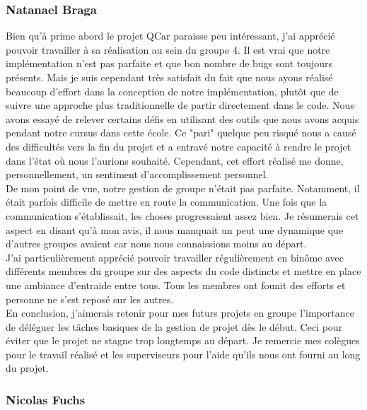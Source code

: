\documentclass[a4paper, 12pt]{article}
\begin{document}
\subsubsection{Natanael Braga}
Bien qu'à prime abord le projet QCar paraisse peu intéressant, j'ai apprécié pouvoir travailler à sa réalisation au sein du groupe 4. Il est vrai que notre implémentation n'est pas parfaite et que bon nombre de bugs sont toujours présents. Mais je suis cependant très satisfait du fait que nous ayons réalisé beaucoup d'effort dans la conception de notre implémentation, plutôt que de suivre une approche plus traditionnelle de partir directement dans le code. Nous avons essayé de relever certains défis en utilisant des outils que nous avons acquis pendant notre cursus dans cette école. Ce "pari" quelque peu risqué nous a causé des difficultés vers la fin du projet et a entravé notre capacité à rendre le projet dans l'état où nous l'aurions souhaité. Cependant, cet effort réalisé me donne, personnellement, un sentiment d'accomplissement personnel.\\
De mon point de vue, notre gestion de groupe n'était pas parfaite. Notamment, il était parfois difficile de mettre en route la communication. Une fois que la communication s'établissait, les choses progressaient assez bien. Je résumerais cet aspect en disant qu'à mon avis, il nous manquait un peut une dynamique que d'autres groupes avaient car nous nous connaissions moins au départ.\\
J'ai particulièrement apprécié pouvoir travailler régulièrement en binôme avec différents membres du groupe sur des aspects du code distincts et mettre en place une ambiance d'entraide entre tous. Tous les membres ont founit des efforts et personne ne s'est reposé sur les autres.\\
En conclusion, j'aimerais retenir pour mes futurs projets en groupe l'importance de déléguer les tâches basiques de la gestion de projet dès le début. Ceci pour éviter que le projet ne stagne trop longtemps au départ. Je remercie mes colègues pour le travail réalisé et les superviseurs pour l'aide qu'ils nous ont fourni au long du projet.

\subsubsection{Nicolas Fuchs}
 
\end{document}
